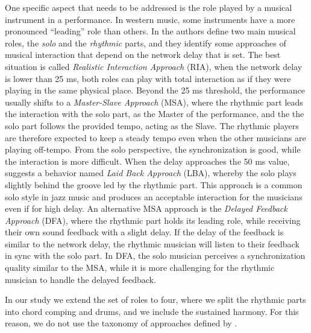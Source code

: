 One specific aspect that needs to be addressed is the role played by a musical instrument in a performance. In western music, some instruments have a more pronounced ``leading'' role than others. In \cite{Carot07networkmusic} the authors define two main musical roles, the \textit{solo} and the \textit{rhythmic} parts, and they identify some approaches of musical interaction that depend on the network delay that is set. The best situation is called \textit{Realistic Interaction Approach} (RIA), when the network delay is lower than 25 ms, both roles can play with total interaction as if they were playing in the same physical place. Beyond the 25 ms threshold, the performance usually shifts to a \textit{Master-Slave Approach} (MSA), where the rhythmic part leads the interaction with the solo part, as the Master of the performance, and the the solo part follows the provided tempo, acting as the Slave. The rhythmic players are therefore expected to keep a steady tempo even when the other musicians are playing off-tempo. From the solo perspective, the synchronization is good, while the interaction is more difficult. When the delay approaches the 50 ms value, \cite{Carot07networkmusic} suggests a behavior named \textit{Laid Back Approach} (LBA), whereby the solo plays slightly behind the groove led by the rhythmic part. This approach is a common solo style in jazz music and produces an acceptable interaction for the musicians even if for high delay. An alternative MSA approach is the \textit{Delayed Feedback Approach} (DFA), where the rhythmic part holds its leading role, while receiving their own sound feedback with a slight delay. If the delay of the feedback is similar to the network delay, the rhythmic musician will listen to their feedback in sync with the solo part. In DFA, the solo musician perceives a synchronization quality similar to the MSA, while it is more challenging for the rhythmic musician to handle the delayed feedback. 

In our study we extend the set of roles to four, where we split the rhythmic parts into chord comping and drums, and we include the sustained harmony. For this reason, we do not use the taxonomy of approaches defined by \cite{Carot07networkmusic}.


